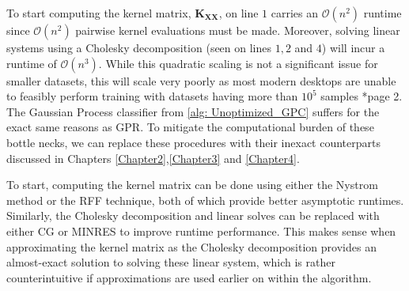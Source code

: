 To start computing the kernel matrix, $\bm{K_{XX}}$, on line $1$ carries an $\mathcal{O} \left( n^2 \right)$ runtime since $\mathcal{O} \left( n^2 \right)$ pairwise kernel evaluations must be made. Moreover, solving linear systems using a Cholesky decomposition (seen on lines $1,2$ and $4$) will incur a runtime of $\mathcal{O} \left( n^3 \right)$. While this quadratic scaling is not a significant issue for smaller datasets, this will scale very poorly as most modern desktops are unable to feasibly perform training with datasets having more than $10^5$ samples \cite{DBLP:journals/corr/abs-2112-15246}*{page 2}. The Gaussian Process classifier from \cref{alg: Unoptimized_GPC} suffers for the exact same reasons as GPR. To mitigate the computational burden of these bottle necks, we can replace these procedures with their inexact counterparts discussed in Chapters \ref{Chapter2},\ref{Chapter3} and \ref{Chapter4}.

To start, computing the kernel matrix can be done using either the Nystrom method or the RFF technique, both of which provide better asymptotic runtimes. Similarly, the Cholesky decomposition and linear solves can be replaced with either CG or MINRES to improve runtime performance. This makes sense when approximating the kernel matrix as the Cholesky decomposition provides an almost-exact solution to solving these linear system, which is rather counterintuitive if approximations are used earlier on within the algorithm.